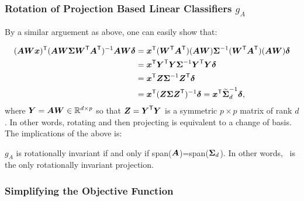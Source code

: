 \documentclass[10pt]{article}
\begin{document}
\subsubsection{Rotation of Projection Based Linear Classifiers $g_A$}

By a similar arguement as above, one can easily show that:
% 

\begin{align*}
(\bA  \bW \bx) \T  (\bA \bW  \bSig  \bW\T \bA\T)^{-1} \bA \bW \bdel 
&= \bx\T (\bW\T \bA\T) (\bA \bW) \bSig^{-1} (\bW\T \bA\T) (\bA \bW) \bdel \\
&= \bx\T \bY\T \bY \bSig^{-1} \bY\T \bY \bdel \\
&= \bx\T \bZ \bSig^{-1} \bZ\T \bdel \\
&= \bx\T (\bZ \bSig \bZ\T)^{-1} \bdel = \bx\T \mt{\bSig}_d^{-1} \bdel,
\end{align*}
where $\bY = \bA \bW \in \Real^{d \times p}$ so that $\bZ=\bY\T \bY$ is a symmetric ${p \times p}$ matrix of rank $d$.  In other words, rotating and then projecting is equivalent to a change of basis.
The implications of the above is: 
\begin{lem}
$g_A$ is rotationally invariant if and only if span($\bA$)=span($\bSig_d$).
In other words, \Pca~is the only rotationally invariant projection.
\end{lem}






\subsubsection{Simplifying the Objective Function}
\end{document}
